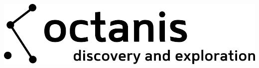 \documentclass[12pt,a4paper,oneside]{article}
\begin{document}
\begin{center}
	\includegraphics{octanis_org_logo_large}
\end{center}

\begin{paracol}{2}\sloppy



\end{paracol}
\end{document}
